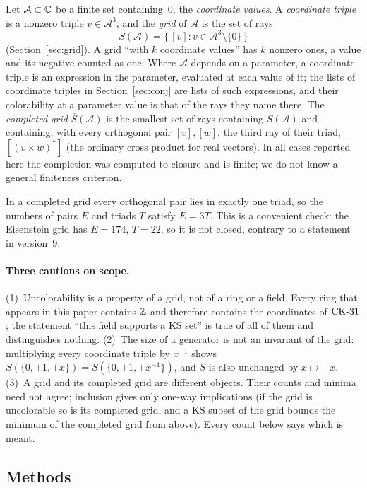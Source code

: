 \begin{definition}
Let $\mathcal A\subset\mathbb{C}$ be a finite set containing~0, the \emph{coordinate values}.  A
\emph{coordinate triple} is a nonzero triple $v\in\mathcal A^3$, and the \emph{grid} of $\mathcal A$ is
the set of rays
\[
S(\mathcal A)=\{\,[v]: v\in\mathcal A^3\setminus\{0\}\,\}
\]
(Section~\ref{sec:grid}).  A grid ``with $k$ coordinate values'' has $k$ nonzero ones, a value and
its negative counted as one.  Where $\mathcal A$ depends on a parameter, a coordinate triple is an
expression in the parameter, evaluated at each value of it; the lists of coordinate triples
in Section~\ref{sec:conj} are lists of such expressions, and their colorability at a parameter
value is that of the rays they name there.  The \emph{completed grid} $\bar S(\mathcal A)$ is the smallest set of rays containing
$S(\mathcal A)$ and containing, with every orthogonal pair $[v],[w]$, the third ray of their
triad, $[(v\times w)^{*}]$ (the ordinary cross product for real vectors).  In all cases reported
here the completion was computed to closure and is finite; we do not know a general finiteness
criterion.
\end{definition}

In a completed grid every orthogonal pair lies in exactly one triad, so the numbers of pairs $E$
and triads $T$ satisfy $E=3T$.  This is a convenient check: the Eisenstein grid has
$E=174$, $T=22$, so it is not closed, contrary to a statement in version~9.

\paragraph{Three cautions on scope.}
(1)~Uncolorability is a property of a grid, not of a ring or a field.  Every ring that appears in
this paper contains $\mathbb{Z}$ and therefore contains the coordinates of $\mathrm{CK}\text{-}31$; the statement ``this
field supports a KS set'' is true of all of them and distinguishes nothing.  (2)~The size of a
generator is not an invariant of the grid: multiplying every coordinate triple by $x^{-1}$ shows
$S(\{0,\pm1,\pm x\})=S(\{0,\pm1,\pm x^{-1}\})$, and $S$ is also unchanged by $x\mapsto-x$.
(3)~A grid and its completed grid are different objects.  Their counts and minima need not
agree; inclusion gives only one-way implications (if the grid is uncolorable so is its
completed grid, and a KS subset of the grid bounds the minimum of the completed grid from
above).  Every count below says which is meant.

\subsection{Methods}\label{sec:methods}

